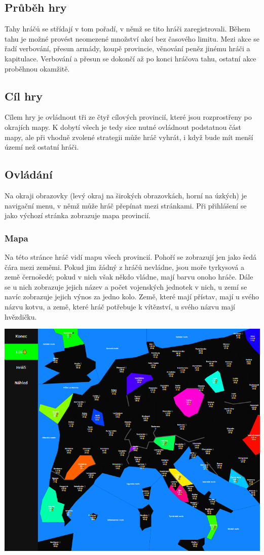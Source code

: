 \documentclass[a4paper,12pt]{article}
\begin{document}
\subsection{Průběh hry}
Tahy hráčů se střídají v tom pořadí, v němž se tito hráči zaregistrovali. Během tahu je možné provést neomezené množství akcí bez časového limitu. Mezi akce se řadí verbování, přesun armády, koupě provincie, věnování peněz jinému hráči a kapitulace. Verbování a přesun se dokončí až po konci hráčova tahu, ostatní akce proběhnou okamžitě.
\subsection{Cíl hry}
Cílem hry je ovládnout tři ze čtyř cílových provincií, které jsou rozprostřeny po okrajích mapy. K dobytí všech je tedy sice nutné ovládnout podstatnou část mapy, ale při vhodně zvolené strategii může hráč vyhrát, i když bude mít menší území než ostatní hráči.
\subsection{Ovládání}
Na okraji obrazovky (levý okraj na širokých obrazovkách, horní na úzkých) je navigační menu, v němž může hráč přepínat mezi stránkami. Při přihlášení se jako výchozí stránka zobrazuje mapa provincií.
\subsubsection{Mapa}
Na této stránce hráč vidí mapu všech provincií. Pohoří se zobrazují jen jako šedá čára mezi zeměmi. Pokud jim žádný z hráčů nevládne, jsou moře tyrkysová a země černošedé; pokud v nich však někdo vládne, mají barvu onoho hráče. Dále se u nich zobrazuje jejich název a počet vojenských jednotek v nich, u zemí se navíc zobrazuje jejich výnos za jedno kolo. Země, které mají přístav, mají u svého názvu kotvu, a země, které hráč potřebuje k vítězství, u svého názvu mají hvězdičku.


\includegraphics[width=\textwidth]{ProvinceMap.png}
\end{document}
